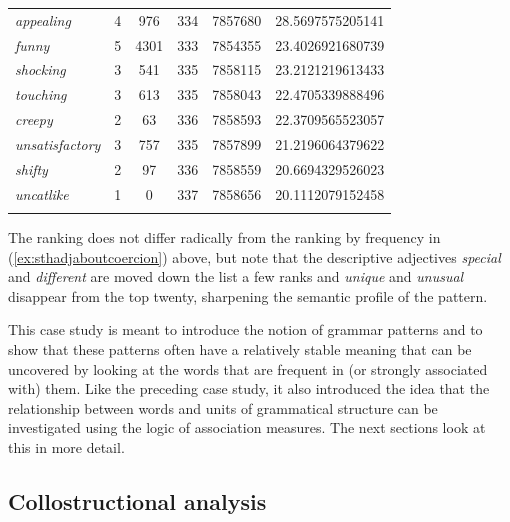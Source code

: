 \begin{table}
{\begin{tabular}[t]{l S[table-format=2] S[table-format=5] S[table-format=3] S[table-format=7] S[table-format=3.2]}
\textit{appealing} & 4 & 976 & 334 & 7857680 & 28.5697575205141 \\
\textit{funny} & 5 & 4301 & 333 & 7854355 & 23.4026921680739 \\
\textit{shocking} & 3 & 541 & 335 & 7858115 & 23.2121219613433 \\
\textit{touching} & 3 & 613 & 335 & 7858043 & 22.4705339888496 \\
\textit{creepy} & 2 & 63 & 336 & 7858593 & 22.3709565523057 \\
\textit{unsatisfactory} & 3 & 757 & 335 & 7857899 & 21.2196064379622 \\
\textit{shifty} & 2 & 97 & 336 & 7858559 & 20.6694329526023 \\
\textit{uncatlike} & 1 & 0 & 337 & 7858656 & 20.1112079152458 \\
\lspbottomrule
{} \\ %
\end{tabular}}
\end{table}

The ranking does not differ radically from the ranking by frequency  in (\ref{ex:sthadjaboutcoercion}) above, but note that the descriptive adjectives  \textit{special} and \textit{different} are moved down the list a few ranks and \textit{unique} and \textit{unusual} disappear from the top twenty, sharpening the semantic  profile of the pattern.

This case study is meant to introduce the notion of grammar patterns  and to show that these patterns often have a relatively stable meaning that can be uncovered by looking at the words that are frequent in (or strongly associated  with) them. Like the preceding case study, it also introduced the idea that the relationship between words and units of grammatical  structure can be investigated using the logic of association  measures.  The next sections look at this in more detail.

\subsection{Collostructional analysis}
\label{sec:collostructionalanalysis}


